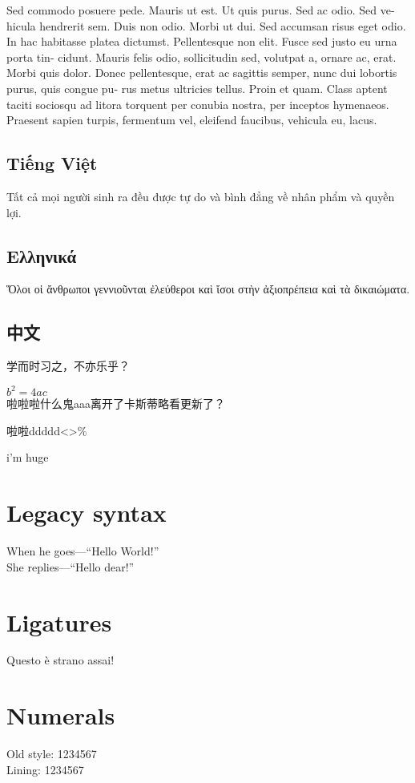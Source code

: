 \documentclass[11pt]{article}
\begin{document}
Sed commodo posuere pede. Mauris ut est. Ut quis purus. Sed ac odio. Sed ve-
hicula hendrerit sem. Duis non odio. Morbi ut dui. Sed accumsan risus eget odio. In hac habitasse platea dictumst. Pellentesque non elit. Fusce sed justo eu urna porta tin- cidunt. Mauris felis odio, sollicitudin sed, volutpat a, ornare ac, erat. Morbi quis dolor. Donec pellentesque, erat ac sagittis semper, nunc dui lobortis purus, quis congue pu- rus metus ultricies tellus. Proin et quam. Class aptent taciti sociosqu ad litora torquent per conubia nostra, per inceptos hymenaeos. Praesent sapien turpis, fermentum vel, eleifend faucibus, vehicula eu, lacus.

\subsection{Tiếng Việt}
Tất cả mọi người sinh ra đều được tự do và bình đẳng về nhân phẩm và
quyền lợi.

\subsection{Ελληνικά}
Ὅλοι οἱ ἄνθρωποι γεννιοῦνται ἐλεύθεροι καὶ ἴσοι στὴν ἀξιοπρέπεια
καὶ τὰ δικαιώματα.

{ 
  \subsection{中文}
  学而时习之，不亦乐乎？

  \(b^2 = 4ac\)\\
  啦啦啦什么鬼aaa离开了卡斯蒂略看更新了？

  啦啦ddddd<>\%
}

{
  \Huge i'm huge
}


\section{Legacy syntax}
When he goes---``Hello World!''\\
She replies---“Hello dear!”

\section{Ligatures}
Questo è strano assai!

\section{Numerals}
 Old style: 1234567\\
 Lining: 1234567
\end{document}
